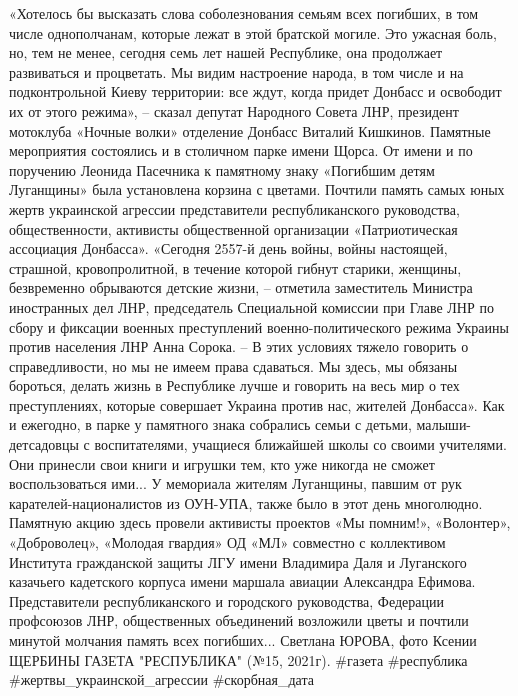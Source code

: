 «Хотелось бы высказать слова соболезнования семьям всех погибших, в том числе однополчанам, которые лежат в этой братской могиле. Это ужасная боль, но, тем не менее, сегодня семь лет нашей Республике, она продолжает развиваться и процветать. Мы видим настроение народа, в том числе и на подконтрольной Киеву территории: все ждут, когда придет Донбасс и освободит их от этого режима», – сказал депутат Народного Совета ЛНР, президент мотоклуба «Ночные волки» отделение Донбасс Виталий Кишкинов.
Памятные мероприятия состоялись и в столичном парке имени Щорса. От имени и по поручению Леонида Пасечника к памятному знаку «Погибшим детям Луганщины» была установлена корзина с цветами. Почтили память самых юных жертв украинской агрессии представители республиканского руководства, общественности, активисты общественной организации «Патриотическая ассоциация Донбасса».
«Сегодня 2557-й день войны, войны настоящей, страшной, кровопролитной, в течение которой гибнут старики, женщины, безвременно обрываются детские жизни, – отметила заместитель Министра иностранных дел ЛНР, председатель Специальной комиссии при Главе ЛНР по сбору и фиксации военных преступлений военно-политического режима Украины против населения ЛНР Анна Сорока. – В этих условиях тяжело говорить о справедливости, но мы не имеем права сдаваться. Мы здесь, мы обязаны бороться, делать жизнь в Республике лучше и говорить на весь мир о тех преступлениях, которые совершает Украина против нас, жителей Донбасса».
Как и ежегодно, в парке у памятного знака собрались семьи с детьми, малыши-детсадовцы с воспитателями, учащиеся ближайшей школы со своими учителями. Они принесли свои книги и игрушки тем, кто уже никогда не сможет воспользоваться ими... 
У мемориала жителям Луганщины, павшим от рук карателей-националистов из ОУН-УПА, также было в этот день многолюдно. Памятную акцию здесь провели активисты проектов «Мы помним!», «Волонтер», «Доброволец», «Молодая гвардия» ОД «МЛ» совместно с коллективом Института гражданской защиты ЛГУ имени Владимира Даля и Луганского казачьего кадетского корпуса имени маршала авиации Александра Ефимова. Представители республиканского и городского руководства, Федерации профсоюзов ЛНР, общественных объединений возложили цветы и почтили минутой молчания память всех погибших... 
Светлана ЮРОВА, 
фото Ксении ЩЕРБИНЫ
ГАЗЕТА "РЕСПУБЛИКА" (№15, 2021г).
#газета #республика #жертвы_украинской_агрессии #скорбная_дата
